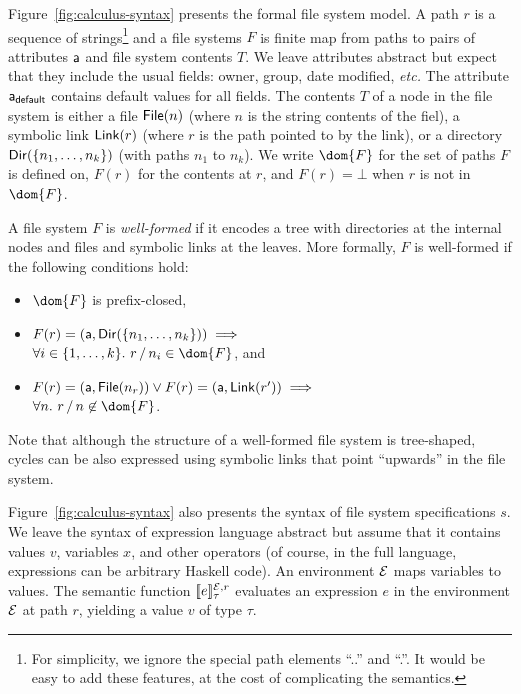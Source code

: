 %
Figure~\ref{fig:calculus-syntax} presents the formal file system
model. A path $r$ is a sequence of strings\footnote{For simplicity, we
  ignore the special path elements ``..'' and ``.''.  It would be easy
  to add these features, at the cost of complicating the semantics.}
and a file systems $F$ is finite map from paths to pairs of attributes
$\mathsf{a}$ and file system contents $T$.  We leave attributes abstract but
expect that they include the usual fields: owner, group, date
modified, {\it etc.}  The attribute $\mathsf{a}_{\mathsf{default}}$ contains default
values for all fields. The contents $T$ of a node in the file system
is either a file $\mathsf{File}(n)$ (where $n$ is the string contents of the
fiel), a symbolic link $\mathsf{Link}(r)$ (where $r$ is the path pointed to by
the link), or a directory $\mathsf{Dir}(\{ n_1,\dots,n_k \})$ (with paths
$n_1$ to $n_k$). We write $\dom{F}$ for the set of paths $F$ is defined on, 
$F(r)$ for the contents at $r$, and $F(r) = \bot$ when $r$ is not
in $\dom{F}$.

A file system $F$ is {\em well-formed} if it encodes a tree with
directories at the internal nodes and files and symbolic links at the
leaves. More formally, $F$ is well-formed if the following conditions
hold:
%
\begin{itemize}
\item $\dom{F}$ is prefix-closed,
\item $F(r) = (\mathsf{a},\mathsf{Dir}( \{ n_1,\dots,n_k \} )) \implies$\\ \hspace*{3.3mm}$\forall i \in \{1,\dots,k\}.~\PCons{r}{n_i} \in \dom{F}$, and
\item $F(r) = (\mathsf{a},\mathsf{File}(n_r)) \vee F(r) = (\mathsf{a},\mathsf{Link}(r')) \implies$\\ \hspace*{3.3mm}$\forall n.~\PCons{r}{n} \not\in \dom{F}$.
\end{itemize}
%
Note that although the structure of a well-formed file system is
tree-shaped, cycles can be also expressed using symbolic links that
point ``upwards'' in the file system.

%
Figure~\ref{fig:calculus-syntax} also presents the syntax of file
system specifications $s$.  We leave the syntax of expression language
abstract but assume that it contains values $v$, variables $x$, and
other operators (of course, in the full \forest{} language,
expressions can be arbitrary Haskell code).  An environment $\mathcal{E}$
maps variables to values.  The semantic function
$[\![e]\!]^{\mathcal{E},r}_{\tau}$ evaluates an expression $e$ in the
environment $\mathcal{E}$ at path $r$, yielding a value $v$ of type $\tau$.


